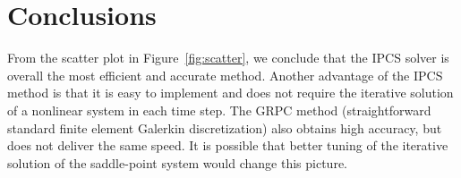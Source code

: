 \section{Conclusions}

From the scatter plot in Figure~\ref{fig:scatter}, we conclude that
the IPCS solver is overall the most efficient and accurate
method. Another advantage of the IPCS method is that it is easy to
implement and does not require the iterative solution of a nonlinear
system in each time step. The GRPC method (straightforward standard
finite element Galerkin discretization) also obtains high accuracy,
but does not deliver the same speed. It is possible that better tuning
of the iterative solution of the saddle-point system would change this
picture.
